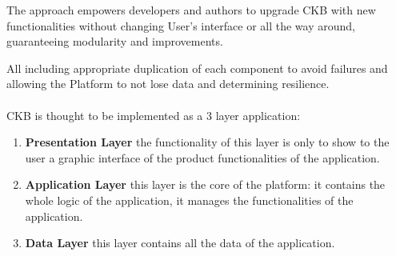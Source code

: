 The approach empowers developers and authors to upgrade CKB with new functionalities without changing User's interface or all the way around, guaranteeing modularity and improvements.

All including appropriate duplication of each component to avoid failures and allowing the Platform to not lose data and determining resilience.\\\\

CKB is thought to be implemented as a 3 layer application:
\begin{enumerate}[label=$\bullet$]
    \item \textbf{Presentation Layer} the functionality of this layer is only to show to the user a graphic interface of the product functionalities of the application.
    \item \textbf{Application Layer} this layer is the core of the platform: it contains the whole logic of the application, it manages the functionalities of the application.
    \item \textbf{Data Layer} this layer contains all the data of the application.
\end{enumerate}

